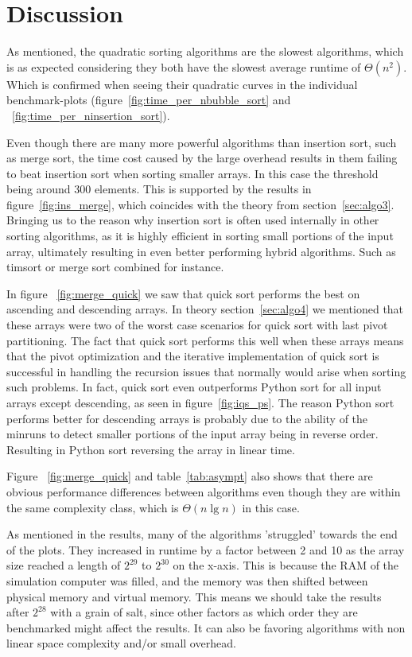 \documentclass[sigconf, nonacm, natbib, screen, balance=False]{acmart}
\begin{document}
\section{Discussion}\label{sec:discussion}

As mentioned, the quadratic sorting algorithms are the slowest algorithms, which is as expected considering they both have the slowest average runtime of $\Theta(n^2)$. Which is confirmed when seeing their quadratic curves in the individual benchmark-plots (figure~\ref{fig:time_per_nbubble_sort} and ~\ref{fig:time_per_ninsertion_sort}). 

Even though there are many more powerful algorithms than insertion sort, such as merge sort, the time cost caused by the large overhead results in them failing to beat insertion sort when sorting smaller arrays. In this case the threshold being around 300 elements. This is supported by the results in figure~\ref{fig:ins_merge}, which coincides with the theory from section~\ref{sec:algo3}. Bringing us to the reason why insertion sort is often used internally in other sorting algorithms, as it is highly efficient in sorting small portions of the input array, ultimately resulting in even better performing hybrid algorithms. Such as timsort or merge sort combined for instance.

In figure ~\ref{fig:merge_quick} we saw that quick sort performs the best on ascending and descending arrays. In theory section~\ref{sec:algo4} we mentioned that these arrays were two of the worst case scenarios for quick sort with last pivot partitioning. The fact that quick sort performs this well when these arrays means that the pivot optimization and the iterative implementation of quick sort is successful in handling the recursion issues that normally would arise when sorting such problems. In fact, quick sort even outperforms Python sort for all input arrays except descending, as seen in figure~\ref{fig:iqs_ps}. The reason Python sort performs better for descending arrays is probably due to the ability of the minruns to detect smaller portions of the input array being in reverse order. Resulting in Python sort reversing the array in linear time. 

Figure ~\ref{fig:merge_quick} and table~\ref{tab:asympt} also shows that there are obvious performance differences between algorithms even though they are within the same complexity class, which is $\Theta(n\lg n)$ in this case.

As mentioned in the results, many of the algorithms 'struggled' towards the end of the plots. They increased in runtime by a factor between 2 and 10 as the array size reached a length of $2^{29}$ to $2^{30}$ on the x-axis. This is because the RAM of the simulation computer was filled, and the memory was then shifted between physical memory and virtual memory. This means we should take the results after $2^{28}$ with a grain of salt, since other factors as which order they are benchmarked might affect the results. It can also be favoring algorithms with non linear space complexity and/or small overhead. 
\end{document}
